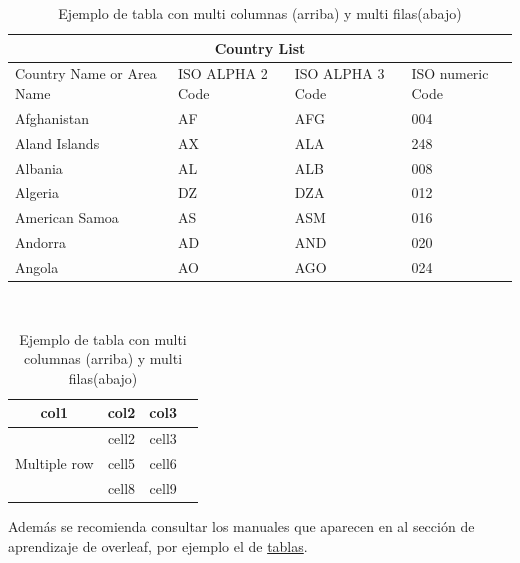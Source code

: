 \begin{table}[htbp!]
    \centering
    \caption{Ejemplo de tabla con multi columnas (arriba) y multi filas(abajo)}
    \begin{tabular}{ |p{3cm}||p{3cm}|p{3cm}|p{3cm}|  }
        \hline
        \multicolumn{4}{|c|}{Country List} \\
        \hline
        Country Name or Area Name& ISO ALPHA 2 Code &ISO ALPHA 3 Code&ISO numeric Code\\
        \hline
        Afghanistan   & AF    &AFG&   004\\
        Aland Islands&   AX  & ALA   &248\\
        Albania &AL & ALB&  008\\
        Algeria    &DZ & DZA&  012\\
        American Samoa&   AS  & ASM&016\\
        Andorra& AD  & AND   &020\\
        Angola& AO  & AGO&024\\
        \hline
    \end{tabular}\\
    \vspace{0.5cm}
    \begin{tabular}{ |c|c|c|c| } 
        \hline
        col1 & col2 & col3 \\
        \hline
        \multirow{3}{4em}{Multiple row} & cell2 & cell3 \\ 
        & cell5 & cell6 \\ 
        & cell8 & cell9 \\ 
        \hline
    \end{tabular}

    \label{tab:tablasEx}
\end{table}

Adem\'as se recomienda consultar los manuales que aparecen en al secci\'on de aprendizaje de overleaf, por ejemplo el de \href{https://www.overleaf.com/learn/latex/Tables}{tablas}.